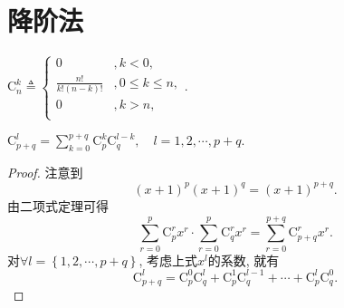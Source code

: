 \documentclass[../../main.tex]{subfiles}
\begin{document}
\section{降阶法}

\begin{definition}[组合数定义的扩充]\label{definition:组合数定义的扩充}
$ \mathrm{C}_{n}^{k}\triangleq \begin{cases}
0&,k<0,\\
\frac{n!}{k!\left( n-k \right) !}&,0\leqslant k\leqslant n,\\
0&,k>n,\\
\end{cases}.$
\end{definition}

\begin{theorem}[Vandermode恒等式]\label{theorem:Vandermode恒等式}
$\mathrm{C}_{p+q}^{l}=\sum_{k=0}^{p+q}{\mathrm{C}_{p}^{k}\mathrm{C}_{q}^{l-k}},\quad l=1,2,\cdots,p+q.$
\end{theorem}
\begin{proof}
注意到
\[
\left( x+1 \right) ^p\left( x+1 \right) ^q=\left( x+1 \right) ^{p+q}.
\]
由二项式定理可得
\[
\sum_{r=0}^p{\mathrm{C}_{p}^{r}x^r}\cdot \sum_{r=0}^p{\mathrm{C}_{q}^{r}x^r}=\sum_{r=0}^{p+q}{\mathrm{C}_{p+q}^{r}x^r}.
\]
对$\forall l=\left\{ 1,2,\cdots ,p+q \right\}$, 考虑上式$x^l$的系数, 就有
\[
\mathrm{C}_{p+q}^{l}=\mathrm{C}_{p}^{0}\mathrm{C}_{q}^{l}+\mathrm{C}_{p}^{1}\mathrm{C}_{q}^{l-1}+\cdots +\mathrm{C}_{p}^{l}\mathrm{C}_{q}^{0}.
\]
\end{proof}
\end{document}
